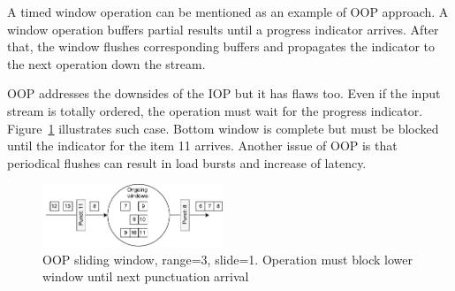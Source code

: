 A timed window operation can be mentioned as an example of OOP approach. A window operation buffers partial results until a progress indicator arrives. After that, the window flushes corresponding buffers and propagates the indicator to the next operation down the stream.

OOP addresses the downsides of the IOP but it has flaws too. Even if the input stream is totally ordered, the operation must wait for the progress indicator. Figure~\ref{oop} illustrates such case. Bottom window is complete but must be blocked until the indicator for the item 11 arrives. Another issue of OOP is that periodical flushes can result in load bursts and increase of latency. 

\begin{figure}[htbp]
  \centering
  \includegraphics[width=0.48\textwidth]{pics/oop}
  \caption{OOP sliding window, range=3, slide=1. Operation must block lower window until next punctuation arrival }
  \label {oop}
\end{figure}
